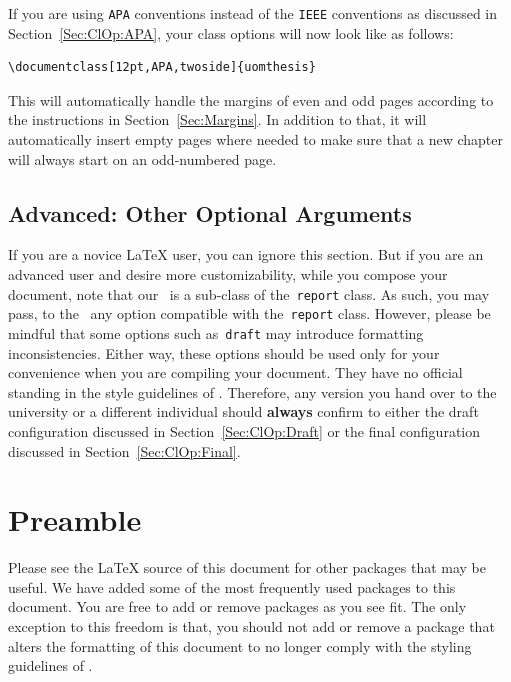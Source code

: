 \documentclass[12pt]{uomthesis}
\begin{document}
If you are using \texttt{APA} conventions instead of the \texttt{IEEE} conventions as discussed in Section~\ref{Sec:ClOp:APA}, your class options will now look like as follows:

\begin{indentedQuote}
\begin{verbatim}
\documentclass[12pt,APA,twoside]{uomthesis}
\end{verbatim}
\end{indentedQuote}

This will automatically handle the margins of even and odd pages according to the instructions in Section~\ref{Sec:Margins}. In addition to that, it will automatically insert empty pages where needed to make sure that a new chapter will always start on an odd-numbered page.

\subsection{Advanced: Other Optional Arguments}
\label{Sec:ClOp:Optional}

If you are a novice \LaTeX{} user, you can ignore this section. But if you are an advanced user and desire more customizability, while you compose your document, note that our~\TheClass{} is a sub-class of the~\texttt{report} class. As such, you may pass, to the~\TheClass{} any option compatible with the~\texttt{report} class. However, please be mindful that some options such as~\texttt{draft} may introduce formatting inconsistencies. Either way, these options should be used only for your convenience when you are compiling your document. They have no official standing in the style guidelines of \UoM. Therefore, any version you hand over to the university or a different individual should \textbf{always} confirm to either the draft configuration discussed in Section~\ref{Sec:ClOp:Draft} or the final configuration discussed in Section~\ref{Sec:ClOp:Final}.



\section{Preamble}
\label{Sec:Pre}

Please see the \LaTeX{} source of this document for other packages that may be useful. We have added some of the most frequently used packages to this document. You are free to add or remove packages as you see fit. The only exception to this freedom is that, you should not add or remove a package that alters the formatting of this document to no longer comply with the styling guidelines of \UoM. 
\end{document}
